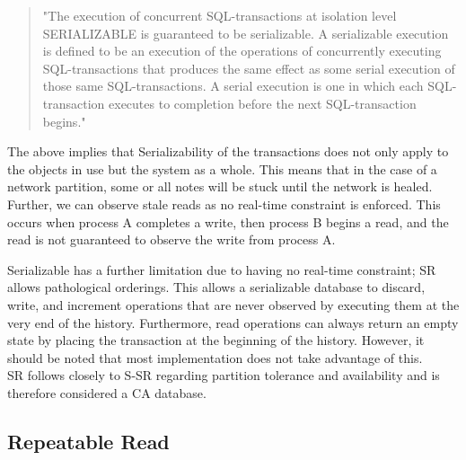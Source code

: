 \documentclass[a4paper,10pt,titlepage]{report}
\begin{document}
\begin{quote}
"The execution of concurrent SQL-transactions at isolation level SERIALIZABLE is guaranteed to be serializable. A serializable execution is defined to be an execution of the operations of concurrently executing SQL-transactions that produces the same effect as some serial execution of those same SQL-transactions. A serial execution is one in which each SQL-transaction executes to completion before the next SQL-transaction begins."\cite{ansisql1999}\\
\end{quote}
\vspace{5mm}

The above implies that Serializability of the transactions does not only apply to the objects in use but the system as a whole. This means that in the case of a network partition, some or all notes will be stuck until the network is healed. Further, we can observe stale reads as no real-time constraint is enforced. This occurs when process A completes a write, then process B begins a read, and the read is not guaranteed to observe the write from process A.
\\ \vspace{5mm}

Serializable has a further limitation due to having no real-time constraint; SR allows pathological orderings. This allows a serializable database to discard, write, and increment operations that are never observed by executing them at the very end of the history. Furthermore, read operations can always return an empty state by placing the transaction at the beginning of the history. However, it should be noted that most implementation does not take advantage of this.
\\ \vspace{5mm}
SR follows closely to S-SR regarding partition tolerance and availability and is therefore considered a CA database.
\\ \vspace{5mm}
\vspace{2mm}

\vspace{2mm}
\newpage
\subsection{Repeatable Read}
\end{document}
